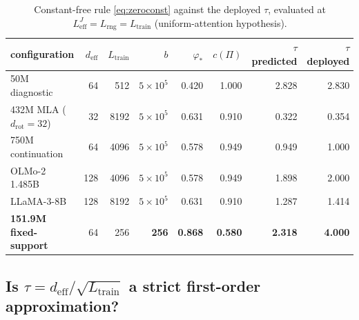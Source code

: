 \documentclass[11pt]{article}
\theoremstyle{definition}
\newcommand{\deff}{d_{\mathrm{eff}}}
\newcommand{\drot}{d_{\mathrm{rot}}}
\newcommand{\Ltr}{L_{\mathrm{train}}}
\newcommand{\Leff}{L_{\mathrm{eff}}^{J}}
\begin{document}
\begin{table}[t]\centering\small
\caption{Constant-free rule \eqref{eq:zeroconst} against the deployed $\tau$, evaluated at
$\Leff=L_{\mathrm{rng}}=\Ltr$ (uniform-attention hypothesis).}
\label{tab:tau}
\begin{tabular}{lrrrrrrr}
\toprule
configuration & $\deff$ & $\Ltr$ & $b$ & $\varphi_*$ & $c(\Pi)$ & $\tau$ predicted & $\tau$ deployed\\
\midrule
50M diagnostic        & 64  & 512  & $5{\times}10^5$ & 0.420 & 1.000 & 2.828 & 2.830\\
432M MLA ($\drot{=}32$)& 32 & 8192 & $5{\times}10^5$ & 0.631 & 0.910 & 0.322 & 0.354\\
750M continuation     & 64  & 4096 & $5{\times}10^5$ & 0.578 & 0.949 & 0.949 & 1.000\\
OLMo-2 1.485B         & 128 & 4096 & $5{\times}10^5$ & 0.578 & 0.949 & 1.898 & 2.000\\
LLaMA-3-8B            & 128 & 8192 & $5{\times}10^5$ & 0.631 & 0.910 & 1.287 & 1.414\\
\midrule
\textbf{151.9M fixed-support} & 64 & 256 & \textbf{256} & \textbf{0.868} & \textbf{0.580} & \textbf{2.318} & \textbf{4.000}\\
\bottomrule
\end{tabular}
\end{table}

\subsection{Is \texorpdfstring{$\tau=\deff/\sqrt{\Ltr}$}{tau=deff/sqrt(Ltrain)} a strict first-order approximation?}
\end{document}
